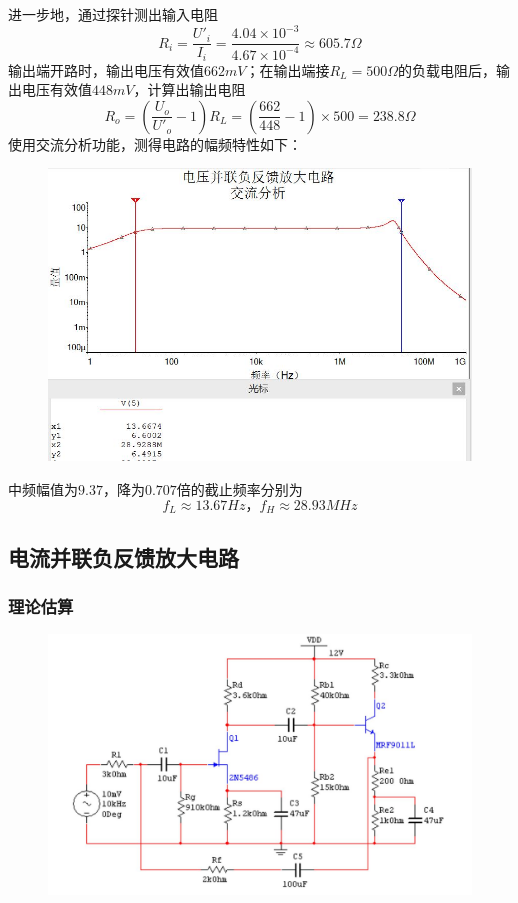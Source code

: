 \documentclass[12pt,a4paper]{article}
\begin{document}
\begin{spacing}{1.3}
\begin{figure}[H]
\end{figure}
进一步地，通过探针测出输入电阻
\[
R_i = \frac{U'_i}{I_i} = \frac{4.04 \times 10^{-3}}{4.67 \times 10^{-4}} \approx 605.7\Omega
\]
输出端开路时，输出电压有效值$662mV$；在输出端接$R_L = 500\Omega$的负载电阻后，输出电压有效值$448mV$，计算出输出电阻
\[
R_o = (\frac{U_o}{U'_o}-1)R_L = (\frac{662}{448}-1)\times 500 = 238.8\Omega
\]
使用交流分析功能，测得电路的幅频特性如下：
\begin{figure}[H]
\centering
\includegraphics[width=\textwidth]{4.jpg}
\end{figure}
中频幅值为$9.37，降为0.707$倍的截止频率分别为
\[f_L \approx 13.67Hz，f_H \approx 28.93MHz\]
\subsection{电流并联负反馈放大电路}
\subsubsection{理论估算}
\begin{figure}[H]
\centering
\includegraphics[width=12cm]{6.jpg}
\end{figure}

\end{spacing}
\end{document}

